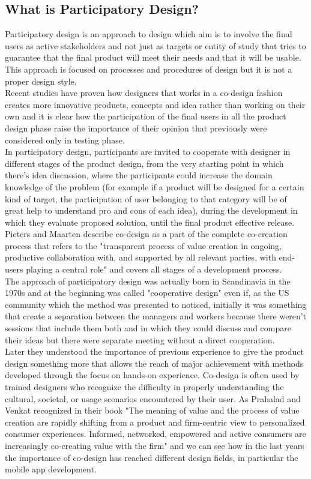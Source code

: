 \subsection{What is Participatory Design?}
Participatory design is an approach to design which aim is to involve the final users as active stakeholders and not just as targets or entity of study that tries to guarantee that the final product will meet their needs and that it will be usable. This approach is focused on processes and procedures of design but it is not a proper design style.\\
Recent studies \cite{Val} have proven how designers that works in a co-design fashion creates more innovative products, concepts and idea rather than working on their own and it is clear how the participation of the final users in all the product design phase raise the importance of their opinion that previously were considered only in testing phase. \\
In participatory design, participants are invited to cooperate with designer in different stages of the product design, from the very starting point in which there's idea discussion, where the participants could increase the domain knowledge of the problem (for example if a product will be designed for a certain kind of target, the participation of user belonging to that category will be of great help to understand pro and cons of each idea), during the development in which they evaluate proposed solution, until the final product effective release. Pieters and Maarten \cite{7Princ} describe co-design as a part of the complete co-creation process that refers to the "transparent process of value creation in ongoing, productive collaboration with, and supported by all relevant parties, with end-users playing a central role" and covers all stages of a development process.\\
The approach of participatory design was actually born in Scandinavia in the 1970s and at the beginning was called "cooperative design" even if, as the US community which the method was presented to noticed, initially it was something that create a separation between the managers and workers because there weren't sessions that include them both and in which they could discuss and compare their ideas but there were separate meeting without a direct cooperation.\\
Later they understood the importance of previous experience to give the product design something more that allows the reach of major achievement with methods developed through the focus on hands-on experience.
Co-design is often used by trained designers who recognize the difficulty in properly understanding the cultural, societal, or usage scenarios encountered by their user. As Prahalad and Venkat recognized in their book \cite{Cocreate} "The meaning of value and the process of value creation are rapidly shifting from a product and firm-centric view to personalized consumer experiences. Informed, networked, empowered and active consumers are increasingly co-creating value with the firm" and we can see how in the last years the importance of co-design has reached different design fields, in particular the mobile app development.

